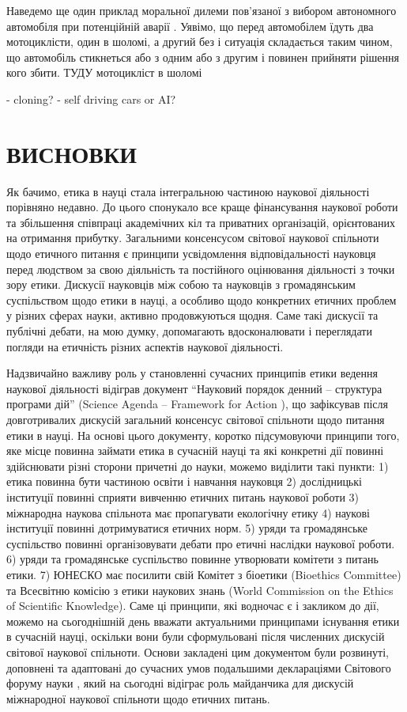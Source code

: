 Наведемо ще один приклад моральної дилеми пов'язаної з вибором автономного автомобіля при потенційній аварії \cite{goodall2014ethical}. Уявімо, що перед автомобілем їдуть два мотоциклісти, один в шоломі, а другий без і ситуація складається таким чином, що автомобіль стикнеться або з одним або з другим і повинен прийняти рішення кого збити. ТУДУ мотоцикліст в шоломі

- cloning?
- self driving cars or AI?

\clearpage

\section*{ВИСНОВКИ}

Як бачимо, етика в науці стала інтегральною частиною наукової діяльності порівняно недавно. До цього спонукало все краще фінансування наукової роботи та збільшення співпраці академічних кіл та приватних організацій, орієнтованих на отримання прибутку. Загальними консенсусом світової наукової спільноти щодо етичного питання є принципи усвідомлення відповідальності науковця перед людством за свою діяльність та постійного оцінювання діяльності з точки зору етики. Дискусії науковців між собою та науковців з громадянським суспільством щодо етики в науці, а особливо щодо конкретних етичних проблем у різних сферах науки, активно продовжуються щодня. Саме такі дискусії та публічні дебати, на мою думку, допомагають вдосконалювати і переглядати погляди на етичність різних аспектів наукової діяльності.

Надзвичайно важливу роль у становленні сучасних принципів етики ведення наукової діяльності відіграв документ \foreignquote{ukrainian}{Науковий порядок денний – структура програми дій} (Science Agenda – Framework for Action \cite[476]{WorldConferenceOnScience}), що зафіксував після довготривалих дискусій загальний консенсус світової спільноти щодо питання етики в науці. На основі цього документу, коротко підсумовуючи принципи того, яке місце повинна займати етика в сучасній науці та які конкретні дії повинні здійснювати різні сторони причетні до науки, можемо виділити такі пункти: 1) етика повинна бути частиною освіти і навчання науковця 2) дослідницькі інституції повинні сприяти вивченню етичних питань наукової роботи 3) міжнародна наукова спільнота має пропагувати екологічну етику 4) наукові інституції повинні дотримуватися етичних норм. 5) уряди та громадянське суспільство повинні організовувати дебати про етичні наслідки наукової роботи. 6) уряди та громадянське суспільство повинне утворювати комітети з питань етики. 7) ЮНЕСКО має посилити свій Комітет з біоетики (Bioethics Committee) та Всесвітню комісію з етики наукових знань (World Commission on the Ethics of Scientific Knowledge). Саме ці принципи, які водночас є і закликом до дії, можемо на сьогоднішній день вважати актуальними принципами існування етики в сучасній науці, оскільки вони були сформульовані після численних дискусій світової наукової спільноти. Основи закладені цим документом були розвинуті, доповнені та адаптовані до сучасних умов подальшими деклараціями Світового форуму науки \cite{WorldScienceForumDeclaration2019}, який на сьогодні відіграє роль майданчика для дискусій міжнародної наукової спільноти щодо етичних питань.

